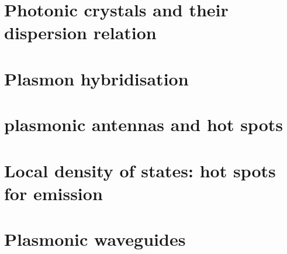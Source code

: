\renewcommand{\chapterauthors}{Markus Lippitz}
\renewcommand{\lastmod}{July 39, 2020}


\chapter{Photonic crystals and their  dispersion relation}

\chapter{Plasmon hybridisation}

\chapter{plasmonic antennas and hot spots}


\chapter{Local density of states: hot spots for emission}

\chapter{Plasmonic waveguides}




%
%
%
%
%
%
%
%
%
%
%

